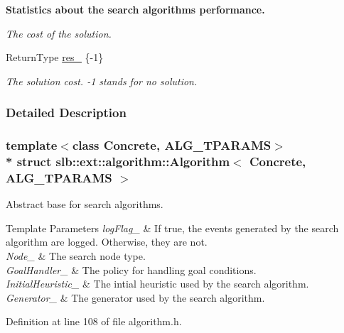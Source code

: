 \begin{Indent}{\bf Statistics about the search algorithm\textquotesingle{}s performance.}
\begin{DoxyCompactItemize}
\begin{DoxyCompactList}\small\item\em The cost of the solution. \end{DoxyCompactList}\item 
Return\+Type \hyperlink{structslb_1_1ext_1_1algorithm_1_1Algorithm_ac01ce5a7230cbc835507bfc00d37fe5d}{res\+\_\+} \{-\/1\}\hypertarget{structslb_1_1ext_1_1algorithm_1_1Algorithm_ac01ce5a7230cbc835507bfc00d37fe5d}{}\label{structslb_1_1ext_1_1algorithm_1_1Algorithm_ac01ce5a7230cbc835507bfc00d37fe5d}

\begin{DoxyCompactList}\small\item\em The solution cost. -\/1 stands for no solution. \end{DoxyCompactList}\end{DoxyCompactItemize}
\end{Indent}


\subsubsection{Detailed Description}
\subsubsection*{template$<$class Concrete, A\+L\+G\+\_\+\+T\+P\+A\+R\+A\+MS$>$\\*
struct slb\+::ext\+::algorithm\+::\+Algorithm$<$ Concrete, A\+L\+G\+\_\+\+T\+P\+A\+R\+A\+M\+S $>$}

Abstract base for search algorithms. 


\begin{DoxyTemplParams}{Template Parameters}
{\em log\+Flag\+\_\+} & If {\ttfamily true}, the events generated by the search algorithm are logged. Otherwise, they are not. \\
\hline
{\em Node\+\_\+} & The search node type. \\
\hline
{\em Goal\+Handler\+\_\+} & The policy for handling goal conditions. \\
\hline
{\em Initial\+Heuristic\+\_\+} & The intial heuristic used by the search algorithm. \\
\hline
{\em Generator\+\_\+} & The generator used by the search algorithm. \\
\hline
\end{DoxyTemplParams}


Definition at line 108 of file algorithm.\+h.



